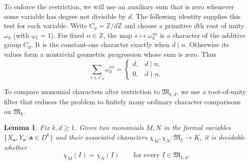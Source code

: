 \documentclass[11pt,letterpaper,onecolumn]{article}
\theoremstyle{plain}
\newtheorem{lemma}[lemma]{Lemma}
\theoremstyle{definition}
\theoremstyle{remark}
\newcommand{\InstMonoid}[1]{\mathfrak M_{#1}}
\begin{document}
To enforce the restriction, we will use an auxiliary sum that is zero
whenever some variable has degree not divisible by $d$.  The following
identity supplies this test for each variable.  Write
$C_d=\mathbb Z/d\mathbb Z$ and choose a primitive
$d$th root of unity $\omega_d$ (with $\omega_1=1$).  For fixed
$n\in\mathbb Z$, the map $s\mapsto\omega_d^{sn}$ is a character of the
additive group $C_d$.  It is the constant-one character exactly when
$d\mid n$. Otherwise its values form a nontrivial geometric progression
whose sum is zero.  Thus
\begin{equation}
  \sum_{s\in C_d}\omega_d^{sn}
  =
  \begin{cases}
    d,&d\mid n,\\
    0,&d\nmid n.
  \end{cases}
  \label{eq:cyclic-character-filter}
\end{equation}

To compare monomial characters after restriction to
$\mathfrak M_{k,d}$, we use a root-of-unity filter that reduces the
problem to finitely many ordinary character comparisons on
$\InstMonoid{k}$.

\begin{lemma}
\label{lem:degree-filtered-character-comparison}
Fix $k,d\ge1$.  Given two monomials $M,N$ in the formal variables
$\{X_{\mathbf a},Y_{\mathbf a}:\mathbf a\in D^k\}$ and their associated
characters $\chi_M,\chi_N:\InstMonoid{k}\to K$, it is decidable whether
\begin{equation}
  \chi_M(I)=\chi_N(I)
  \qquad\text{for every }I\in\mathfrak M_{k,d}.
  \label{eq:degree-filtered-character-goal}
\end{equation}
\end{lemma}
\end{document}
